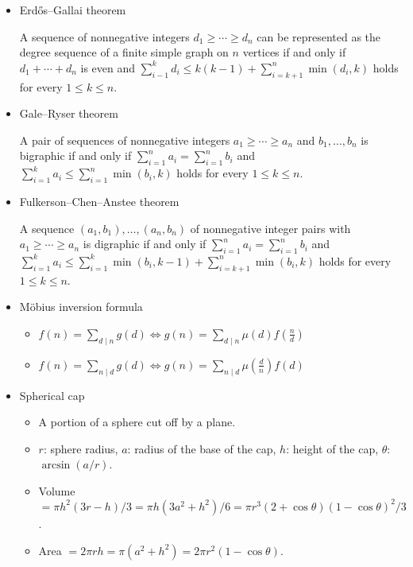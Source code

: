 \begin{itemize}
    \item Erdős–Gallai theorem 
    
    A sequence of nonnegative integers $d_1\ge\cdots\ge d_n$ can be represented as the degree sequence of a finite simple graph on $n$ vertices if and only if $d_1+\cdots+d_n$ is even and $\displaystyle\sum_{i-1}^kd_i\le k(k-1)+\displaystyle\sum_{i=k+1}^n\min(d_i,k)$ holds for every $1\le k\le n$.
    
    \item Gale–Ryser theorem
    
    A pair of sequences of nonnegative integers $a_1\ge\cdots\ge a_n$ and $b_1,\ldots,b_n$ is bigraphic if and only if $\displaystyle\sum_{i=1}^n a_i=\displaystyle\sum_{i=1}^n b_i$ and $\displaystyle\sum_{i=1}^k a_i\le \displaystyle\sum_{i=1}^n\min(b_i,k)$ holds for every $1\le k\le n$.
    
    \item Fulkerson–Chen–Anstee theorem
    
    A sequence $(a_1,b_1),\ldots,(a_n,b_n)$ of nonnegative integer pairs with $a_1\ge\cdots\ge a_n$ is digraphic if and only if $\displaystyle\sum_{i=1}^n a_i=\displaystyle\sum_{i=1}^n b_i$ and $\displaystyle\sum_{i=1}^k a_i\le \displaystyle\sum_{i=1}^k\min(b_i,k-1)+\displaystyle\sum_{i=k+1}^n\min(b_i,k)$ holds for every $1\le k\le n$.
    
    \item Möbius inversion formula
    
    \begin{itemize}
        \itemsep-0.5em
      \item $f(n)=\sum_{d\mid n}g(d)\Leftrightarrow g(n)=\sum_{d\mid n}\mu(d)f(\frac{n}{d})$
      \item $f(n)=\sum_{n\mid d}g(d)\Leftrightarrow g(n)=\sum_{n\mid d}\mu(\frac{d}{n})f(d)$
    \end{itemize}
    
    \item Spherical cap
    
    \begin{itemize}
        \itemsep-0.5em
      \item A portion of a sphere cut off by a plane.
      \item $r$: sphere radius, $a$: radius of the base of the cap, $h$: height of the cap, $\theta$: $\arcsin(a/r)$.
      \item Volume $=\pi h^2(3r-h)/3=\pi h(3a^2+h^2)/6=\pi r^3(2+\cos\theta)(1-\cos\theta)^2/3$.
      \item Area $=2\pi rh=\pi(a^2+h^2)=2\pi r^2(1-\cos\theta)$.
    \end{itemize}
    

\end{itemize}
